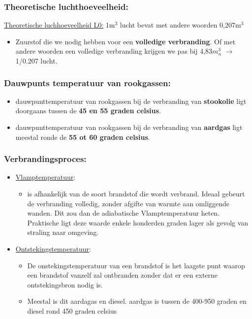 \documentclass[12pt]{article}
\begin{document}
\subsubsection{Theoretische luchthoeveelheid:}
\underline{Theoretische luchhoeveelheid L0:}
1m$^3$ lucht bevat met andere woorden 0,207m$^3$\begin{itemize}
    \item Zuurstof die we nodig hebben voor een \textbf{volledige verbranding}. Of met andere woorden een volledige verbranding krijgen we pas bij 4,83$m_{n}^3$ $\rightarrow$ 1/0.207 lucht.
\end{itemize}
\subsubsection{Dauwpunts temperatuur van rookgassen:}
\begin{itemize}
    \item dauwpunttemperatuur van rookgassen bij de verbranding van \textbf{stookolie} ligt doorgaans tussen de \textbf{45 en 55 graden celsius}.
    \item dauwpunttemperatuur van rookgassen bij de verbranding van \textbf{aardgas} ligt meestal ronde de \textbf{55 ot 60 graden celsius}.
\end{itemize}
\subsubsection{Verbrandingsproces:}
\begin{itemize}
    \item \underline{Vlamptemperatuur}:\begin{itemize}
        \item is afhankelijk van de soort brandstof die wordt verbrand. Ideaal gebeurt de verbranding volledig, zonder afgifte van warmte aan omliggende wanden. Dit zou dan de adiabatische Vlamptemperatuur heten. Praktische ligt deze waarde enkele honderden graden lager als gevolg van straling naar omgeving.
    \end{itemize}
    \item \underline {Ontstekingstemperatuur}:\begin{itemize}
        \item De onstekingstemperatuur van een brandstof is het laagste punt waarop een brandstof vanzelf zal ontbranden zonder dat er een externe ontstekingsbron nodig is.
        \item Meestal is dit aardagas en diesel. aardgas is tussen de 400-950 graden en diesel rond 450 graden celsius
    \end{itemize}
\end{itemize}
\end{document}
